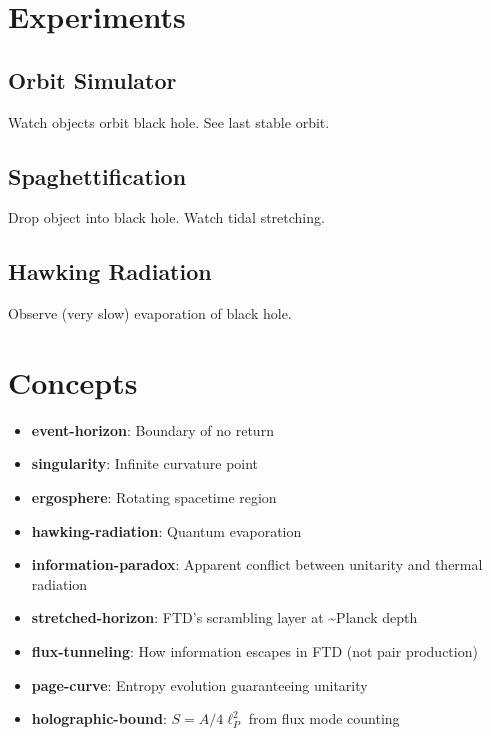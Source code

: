 \documentclass[
  11pt,
  letterpaper,
  twoside,
  openright]{book}
\providecommand{\tightlist}{%
  \setlength{\itemsep}{0pt}\setlength{\parskip}{0pt}}
\begin{document}
\section{Experiments}\label{experiments-33}

\subsection{Orbit Simulator}\label{orbit-simulator}

Watch objects orbit black hole. See last stable orbit.

\subsection{Spaghettification}\label{spaghettification}

Drop object into black hole. Watch tidal stretching.

\subsection{Hawking Radiation}\label{hawking-radiation-2}

Observe (very slow) evaporation of black hole.

\section{Concepts}\label{concepts-32}

\begin{itemize}
\tightlist
\item
  \textbf{event-horizon}: Boundary of no return
\item
  \textbf{singularity}: Infinite curvature point
\item
  \textbf{ergosphere}: Rotating spacetime region
\item
  \textbf{hawking-radiation}: Quantum evaporation
\item
  \textbf{information-paradox}: Apparent conflict between unitarity and
  thermal radiation
\item
  \textbf{stretched-horizon}: FTD's scrambling layer at
  \textasciitilde Planck depth
\item
  \textbf{flux-tunneling}: How information escapes in FTD (not pair
  production)
\item
  \textbf{page-curve}: Entropy evolution guaranteeing unitarity
\item
  \textbf{holographic-bound}: \(S = A/4\ell_P^2\) from flux mode
  counting
\end{itemize}
\end{document}
